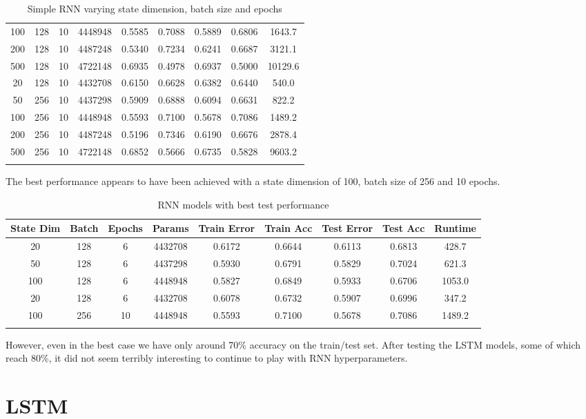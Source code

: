 \documentclass[letterpaper, 10pt]{article}
\begin{document}
\begin{longtable}{c | c | c | c | c | c | c | c | c}
100 & 128 & 10 & 4448948 & 0.5585 & 0.7088 & 0.5889 & 0.6806 & 1643.7 \\
200 & 128 & 10 & 4487248 & 0.5340 & 0.7234 & 0.6241 & 0.6687 & 3121.1 \\
500 & 128 & 10 & 4722148 & 0.6935 & 0.4978 & 0.6937 & 0.5000 & 10129.6 \\
20 & 128 & 10 & 4432708 & 0.6150 & 0.6628 & 0.6382 & 0.6440 & 540.0 \\
50 & 256 & 10 & 4437298 & 0.5909 & 0.6888 & 0.6094 & 0.6631 & 822.2 \\
100 & 256 & 10 & 4448948 & 0.5593 & 0.7100 & 0.5678 & 0.7086 & 1489.2 \\
200 & 256 & 10 & 4487248 & 0.5196 & 0.7346 & 0.6190 & 0.6676 & 2878.4 \\
500 & 256 & 10 & 4722148 & 0.6852 & 0.5666 & 0.6735 & 0.5828 & 9603.2 \\
\caption{Simple RNN varying state dimension, batch size and epochs}
\label{tab:resultsrnn}
\end{longtable}

The best performance appears to have been achieved with a state dimension of 100,
batch size of 256 and 10 epochs.

\begin{longtable}{c | c | c | c | c | c | c | c | c}
State Dim & Batch & Epochs & Params & Train Error & Train Acc & Test Error & Test Acc & Runtime\\
\hline
\endhead
20 & 128 & 6 & 4432708 & 0.6172 & 0.6644 & 0.6113 & 0.6813 & 428.7 \\
50 & 128 & 6 & 4437298 & 0.5930 & 0.6791 & 0.5829 & 0.7024 & 621.3 \\
100 & 128 & 6 & 4448948 & 0.5827 & 0.6849 & 0.5933 & 0.6706 & 1053.0 \\
20 & 128 & 6 & 4432708 & 0.6078 & 0.6732 & 0.5907 & 0.6996 & 347.2 \\
100 & 256 & 10 & 4448948 & 0.5593 & 0.7100 & 0.5678 & 0.7086 & 1489.2 \\
\caption{RNN models with best test performance}
\end{longtable}

However, even in the best case we have only around 70\% accuracy on the train/test set.
After testing the LSTM models, some of which reach 80\%, it did not seem terribly interesting
to continue to play with RNN hyperparameters.

\section{LSTM}
\end{document}

